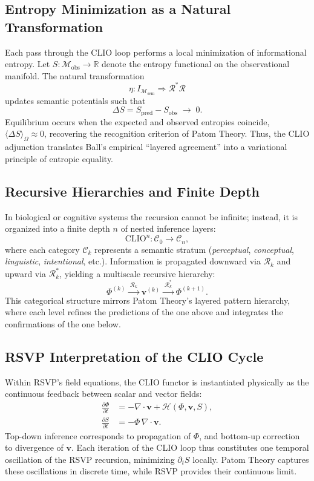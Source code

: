 \documentclass[11pt]{article}
\begin{document}
\subsection{Entropy Minimization as a Natural Transformation}
Each pass through the CLIO loop performs a local minimization of informational entropy. Let $S : \mathcal{M}_{\mathrm{obs}} \!\to\! \mathbb{R}$ denote the entropy functional on the observational manifold. The natural transformation
\[
\eta : I_{\mathcal{M}_{\mathrm{sem}}} \Rightarrow \mathcal{R}^{\ast}\mathcal{R}
\]
updates semantic potentials such that
\[
\Delta S = S_{\mathrm{pred}} - S_{\mathrm{obs}} \;\to\; 0.
\]
Equilibrium occurs when the expected and observed entropies coincide, \(\langle \Delta S \rangle_\Omega \approx 0\), recovering the recognition criterion of Patom Theory. Thus, the CLIO adjunction translates Ball’s empirical “layered agreement” into a variational principle of entropic equality.

\subsection{Recursive Hierarchies and Finite Depth}
In biological or cognitive systems the recursion cannot be infinite; instead, it is organized into a finite depth $n$ of nested inference layers:
\begin{equation}
\mathrm{CLIO}^n :
\mathcal{C}_0 \longrightarrow \mathcal{C}_n,
\end{equation}
where each category $\mathcal{C}_k$ represents a semantic stratum (\textit{perceptual}, \textit{conceptual}, \textit{linguistic}, \textit{intentional}, etc.). Information is propagated downward via $\mathcal{R}_k$ and upward via $\mathcal{R}_k^{\ast}$, yielding a multiscale recursive hierarchy:
\[
\Phi^{(k)} \xrightarrow{\;\mathcal{R}_k\;}
\mathbf{v}^{(k)} \xrightarrow{\;\mathcal{R}_k^{\ast}\;}
\Phi^{(k+1)}.
\]
This categorical structure mirrors Patom Theory’s layered pattern hierarchy, where each level refines the predictions of the one above and integrates the confirmations of the one below.

\subsection{RSVP Interpretation of the CLIO Cycle}
Within RSVP’s field equations, the CLIO functor is instantiated physically as the continuous feedback between scalar and vector fields:
\begin{align}
\frac{\partial \Phi}{\partial t} &= -\nabla\!\cdot\!\mathbf{v} + \mathcal{H}(\Phi,\mathbf{v},S),
\\[4pt]
\frac{\partial S}{\partial t} &= -\Phi\,\nabla\!\cdot\!\mathbf{v}.
\end{align}
Top-down inference corresponds to propagation of $\Phi$, and bottom-up correction to divergence of $\mathbf{v}$. Each iteration of the CLIO loop thus constitutes one temporal oscillation of the RSVP recursion, minimizing $\partial_t S$ locally. Patom Theory captures these oscillations in discrete time, while RSVP provides their continuous limit.
\end{document}
